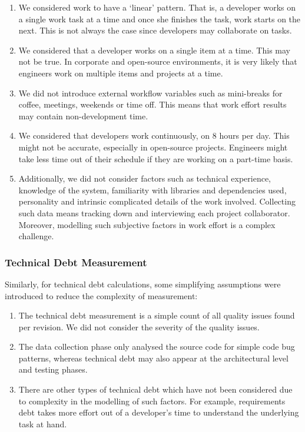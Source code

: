 \documentclass{mpaper}
\begin{document}
\begin{enumerate}
  \item We considered work to have a `linear' pattern. That is, a developer
  works on a single work task at a time and once she finishes the task, work
  starts on the next. This is not always the case since developers may
  collaborate on tasks.

  \item We considered that a developer works on a single item at a time. This
  may not be true. In corporate and open-source environments, it is very likely
  that engineers work on multiple items and projects at a time.

  \item We did not introduce external workflow variables such as mini-breaks for
  coffee, meetings, weekends or time off. This means that work effort results
  may contain non-development time. 

  \item We considered that developers work continuously, on 8 hours per day. This
  might not be accurate, especially in open-source projects. Engineers might
  take less time out of their schedule if they are working on a part-time basis.

  \item Additionally, we did not consider factors such as technical experience,
  knowledge of the system, familiarity with libraries and dependencies used,
  personality and intrinsic complicated details of the work involved.
  Collecting such data means tracking down and interviewing each project
  collaborator. Moreover, modelling such subjective factors in work effort is a
  complex challenge. 
\end{enumerate}

\subsubsection*{Technical Debt Measurement}
\label{validity-td}

Similarly, for technical debt calculations, some simplifying assumptions were
introduced to reduce the complexity of measurement:

\begin{enumerate}
  \item The technical debt measurement is a simple count of all quality issues
  found per revision. We did not consider the severity of the quality issues.
  \item The data collection phase only analysed the source code for simple code
  bug patterns, whereas technical debt may also appear at the architectural
  level and testing phases.
 \item There are other types of technical debt which have not been considered
  due to complexity in the modelling of such factors. For example, requirements
  debt takes more effort out of a developer's time to understand the underlying
  task at hand.
\end{enumerate}
\end{document}
